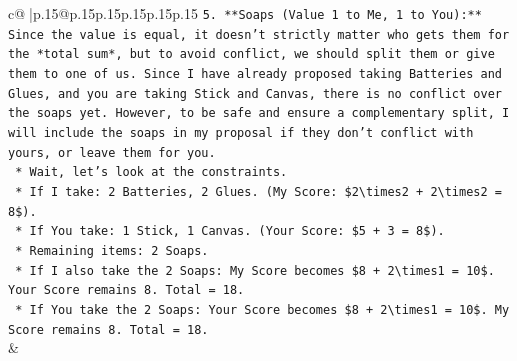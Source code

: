 \documentclass{article}
\begin{document}
{\begin{supertabular}{c@{$\;$}|p{.15\linewidth}@{}p{.15\linewidth}p{.15\linewidth}p{.15\linewidth}p{.15\linewidth}p{.15\linewidth}}
{{{\texttt{5.  **Soaps (Value 1 to Me, 1 to You):** Since the value is equal, it doesn't strictly matter who gets them for the *total sum*, but to avoid conflict, we should split them or give them to one of us. Since I have already proposed taking Batteries and Glues, and you are taking Stick and Canvas, there is no conflict over the soaps yet. However, to be safe and ensure a complementary split, I will include the soaps in my proposal if they don't conflict with yours, or leave them for you.} \\
\texttt{    *   Wait, let's look at the constraints.} \\
\texttt{    *   If I take: 2 Batteries, 2 Glues. (My Score: \$2\textbackslash{}times2 + 2\textbackslash{}times2 = 8\$).} \\
\texttt{    *   If You take: 1 Stick, 1 Canvas. (Your Score: \$5 + 3 = 8\$).} \\
\texttt{    *   Remaining items: 2 Soaps.} \\
\texttt{    *   If I also take the 2 Soaps: My Score becomes \$8 + 2\textbackslash{}times1 = 10\$. Your Score remains 8. Total = 18.} \\
\texttt{    *   If You take the 2 Soaps: Your Score becomes \$8 + 2\textbackslash{}times1 = 10\$. My Score remains 8. Total = 18.} \\
            }
        }
    }
    & \\ \\


\end{supertabular}}
\end{document}
